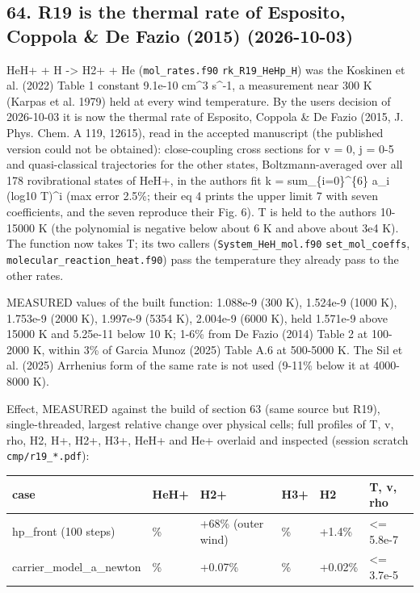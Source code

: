 \documentclass[english,a4paper]{my_memo}
\begin{document}
\subsection{64. R19 is the thermal rate of Esposito, Coppola \& De Fazio (2015) (2026-10-03)}\label{64-r19-is-the-thermal-rate-of-esposito-coppola--de-fazio-2015-2026-10-03}

HeH+ + H -\textgreater{} H2+ + He (\texttt{mol\_rates.f90} \texttt{rk\_R19\_HeHp\_H}) was the Koskinen et
al. (2022) Table 1 constant 9.1e-10 cm\^{}3 s\^{}-1, a measurement near 300 K
(Karpas et al. 1979) held at every wind temperature. By the user\textquotesingle s decision
of 2026-10-03 it is now the thermal rate of Esposito, Coppola \& De Fazio
(2015, J. Phys. Chem. A 119, 12615), read in the accepted manuscript (the
published version could not be obtained): close-coupling cross sections for
v = 0, j = 0-5 and quasi-classical trajectories for the other states,
Boltzmann-averaged over all 178 rovibrational states of HeH+, in the
authors\textquotesingle{} fit k = sum\_\{i=0\}\^{}\{6\} a\_i (log10 T)\^{}i (max error 2.5\%; their eq 4
prints the upper limit 7 with seven coefficients, and the seven reproduce
their Fig. 6). T is held to the authors\textquotesingle{} 10-15000 K (the polynomial is
negative below about 6 K and above about 3e4 K). The function now takes T;
its two callers (\texttt{System\_HeH\_mol.f90} \texttt{set\_mol\_coeffs},
\texttt{molecular\_reaction\_heat.f90}) pass the temperature they already pass to
the other rates.

MEASURED values of the built function: 1.088e-9 (300 K), 1.524e-9
(1000 K), 1.753e-9 (2000 K), 1.997e-9 (5354 K), 2.004e-9 (6000 K), held
1.571e-9 above 15000 K and 5.25e-11 below 10 K; 1-6\% from De Fazio (2014)
Table 2 at 100-2000 K, within 3\% of Garcia Munoz (2025) Table A.6 at
500-5000 K. The Sil et al. (2025) Arrhenius form of the same rate is not
used (9-11\% below it at 4000-8000 K).

Effect, MEASURED against the build of section 63 (same source but R19),
single-threaded, largest relative change over physical cells; full profiles
of T, v, rho, H2, H+, H2+, H3+, HeH+ and He+ overlaid and inspected
(session scratch \texttt{cmp/r19\_*.pdf}):

{\def\LTcaptype{none} %
{\small
\begin{longtable}[]{@{}>{\raggedright\arraybackslash}p{\dimexpr(\linewidth-12\tabcolsep)/6\relax}>{\raggedright\arraybackslash}p{\dimexpr(\linewidth-12\tabcolsep)/6\relax}>{\raggedright\arraybackslash}p{\dimexpr(\linewidth-12\tabcolsep)/6\relax}>{\raggedright\arraybackslash}p{\dimexpr(\linewidth-12\tabcolsep)/6\relax}>{\raggedright\arraybackslash}p{\dimexpr(\linewidth-12\tabcolsep)/6\relax}>{\raggedright\arraybackslash}p{\dimexpr(\linewidth-12\tabcolsep)/6\relax}@{}}
\toprule\noalign{}
case & HeH+ & H2+ & H3+ & H2 & T, v, rho \\
\midrule\noalign{}
\endhead
\bottomrule\noalign{}
\endlastfoot
hp\_front (100 steps) & -46\% & +68\% (outer wind) & -18\% & +1.4\% & \textless= 5.8e-7 \\
carrier\_model\_a\_newton & -35\% & +0.07\% & -0.02\% & +0.02\% & \textless= 3.7e-5 \\
\end{longtable}
}
}
\end{document}
